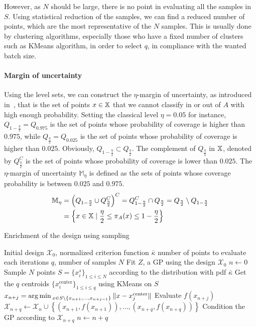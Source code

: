 \documentclass[../../Main_ManuscritThese.tex]{subfiles}
\begin{document}
However, as $N$ should be large, there is no point in evaluating all the samples in $S$. Using statistical reduction of the samples, we can find a reduced number of points, which are the most representative of the $N$ samples. This is usually done by clustering algorithms, especially those who have a fixed number of clusters such as KMeans algorithm, in order to select $q$, in compliance with the wanted batch size.
\paragraph{Margin of uncertainty}
\label{sec:margin_of_uncertainty}

Using the level sets, we can construct the $\eta$-margin of uncertainty, as introduced in~\cite{dubourg_reliability-based_2011}, that is the set of points $x \in \mathbb{X}$ that we cannot classify in or out of $A$ with high enough probability.
Setting the classical level $\eta=0.05$ for instance, $Q_{1-\frac{\eta}{2}}=Q_{0.975}$ is the set of points whose probability of coverage is higher than $0.975$, while $Q_{\frac{\eta}{2}}=Q_{0.025}$ is the set of points whose probability of coverage is higher than $0.025$. Obviously, $Q_{1-\frac{\eta}{2}} \subset Q_{\frac{\eta}{2}}$. The complement of $Q_{\frac{\eta}{2}}$ in $\mathbb{X}$, denoted by $Q_{\frac{\eta}{2}}^C$ is the set of points whose probability of coverage is lower than $0.025$. The $\eta$-margin of uncertainty $\mathbb{M}_{\eta}$ is defined as the sets of points whose coverage probability is between $0.025$ and $0.975$.
\begin{align}
  \label{eq:margin_unc}
  \mathbb{M}_{\eta} &= \left(Q_{1-\frac{\eta}{2}} \cup Q^C_{\frac{\eta}{2}} \right)^C = Q_{1-\frac{\eta}{2}}^C \cap Q_{\frac{\eta}{2}} = Q_{\frac{\eta}{2}} \setminus Q_{1-\frac{\eta}{2}} \\
                    &= \left\{x \in \mathbb{X} \mid \frac{\eta}{2} \leq \pi_A(x) \leq 1 - \frac{\eta}{2} \right\}
\end{align}

\begin{algorithm}
 \caption{Enrichment of the design using sampling}
\begin{algorithmic}
  \REQUIRE Initial design $\mathcal{X}_0$, normalized criterion function $\bar{\kappa}$
  \REQUIRE number of points to evaluate each iterations $q$, number of samples $N$
\STATE Fit $Z$, a GP using the design $\mathcal{X}_0$
\STATE $n \leftarrow 0$
\STATE Sample $N$ points $S = \{x^s_i\}_{1 \leq i \leq N}$ according to the distribution with pdf $\bar{\kappa}$
\STATE Get the $q$ centroids $\{x_i^{\mathrm{center}}\}_{1 \leq i \leq q}$ using KMeans on $S$
\STATE $x_{n+j}=\operatorname*{arg\,min \,}_{x \in S \setminus \{x_{n+1}, \dots, x_{n+j-1}\}} \|x - x_j^{\mathrm{center}} \|$
\ENDFOR
\STATE Evaluate $f(x_{n+j})$
\STATE $\mathcal{X}_{n+q} \leftarrow \mathcal{X}_n \cup \left\{\left(x_{n+1}, f(x_{n+1})\right),\dots,  \left(x_{n+q}, f(x_{n+q})\right)\right\}$
\STATE Condition the GP according to $\mathcal{X}_{n+q}$
\STATE $n \leftarrow n + q$
\ENDWHILE
\end{algorithmic}
\end{algorithm}
\end{document}
